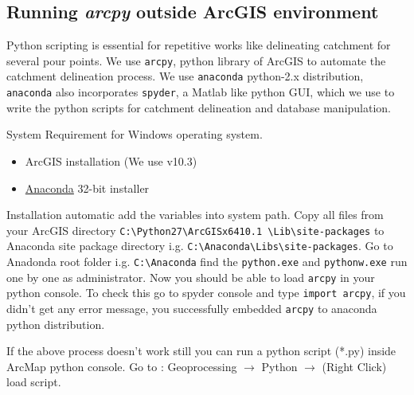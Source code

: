 \documentclass[a4paper, 12pt]{article}
\begin{document}
\subsection{Running \emph{arcpy} outside ArcGIS environment}
Python scripting is essential for repetitive works like delineating catchment for several pour points. We use \texttt{arcpy}, python library of ArcGIS to automate the catchment delineation process. We use \texttt{anaconda} python-2.x distribution, \texttt{anaconda} also incorporates \texttt{spyder}, a Matlab like python GUI, which we use to write the python scripts for catchment delineation and database manipulation.

\noindent System Requirement for Windows operating system.
\begin{itemize}
\item ArcGIS installation (We use v10.3)
\item \href{https://www.anaconda.com/distribution/}{Anaconda} 32-bit installer
\end{itemize}

Installation automatic add the variables into system path. Copy all files from your ArcGIS directory \texttt{C:\textbackslash Python27\textbackslash ArcGISx6410.1 \textbackslash Lib\textbackslash site-packages} to Anaconda site package directory i.g. \texttt{C:\textbackslash Anaconda\textbackslash Libs\textbackslash site-packages}. Go to Anadonda root folder i.g. \texttt{C:\textbackslash Anaconda} find the \texttt{python.exe} and \texttt{pythonw.exe} run one by one as administrator. Now you should be able to load \texttt{arcpy} in your python console. To check this go to spyder console and type \texttt{import arcpy}, if you didn't get any error message, you successfully embedded \texttt{arcpy} to anaconda python distribution.

If the above process doesn't work still you can run a python script (*.py) inside ArcMap python console. Go to : Geoprocessing $\rightarrow$ Python $\rightarrow$ (Right Click) load script.
\end{document}
